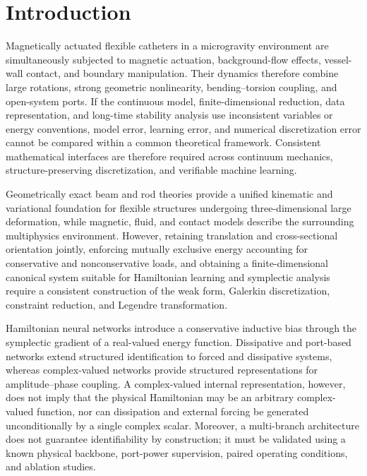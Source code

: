 \section*{Introduction}
\label{sec:introduction}

Magnetically actuated flexible catheters in a microgravity environment are simultaneously subjected to magnetic actuation, background-flow effects, vessel-wall contact, and boundary manipulation. Their dynamics therefore combine large rotations, strong geometric nonlinearity, bending--torsion coupling, and open-system ports. If the continuous model, finite-dimensional reduction, data representation, and long-time stability analysis use inconsistent variables or energy conventions, model error, learning error, and numerical discretization error cannot be compared within a common theoretical framework. Consistent mathematical interfaces are therefore required across continuum mechanics, structure-preserving discretization, and verifiable machine learning.

Geometrically exact beam and rod theories provide a unified kinematic and variational foundation for flexible structures undergoing three-dimensional large deformation, while magnetic, fluid, and contact models describe the surrounding multiphysics environment\cite{Simo1985FiniteStrainBeam,Antman2005Elasticity,Morison1950,COMSOLBeamInterface2025,COMSOLGeometricNonlinearity2025,COMSOLSectionStiffness2025,COMSOLWeakFormPDE2025,COMSOLWeakContribution2025,Sola2018MicroLie,Jackson1998Electrodynamics,Abbott2020MagneticRobotics,Newman1977MarineHydrodynamics,Faltinsen1990SeaLoads,Johnson1985ContactMechanics,HuntCrossley1975Restitution,BrownMcPhee2016Friction,MarsdenRatiu1999MechanicsSymmetry,HairerLubichWanner2006GNI}. However, retaining translation and cross-sectional orientation jointly, enforcing mutually exclusive energy accounting for conservative and nonconservative loads, and obtaining a finite-dimensional canonical system suitable for Hamiltonian learning and symplectic analysis require a consistent construction of the weak form, Galerkin discretization, constraint reduction, and Legendre transformation.

Hamiltonian neural networks introduce a conservative inductive bias through the symplectic gradient of a real-valued energy function. Dissipative and port-based networks extend structured identification to forced and dissipative systems, whereas complex-valued networks provide structured representations for amplitude--phase coupling\cite{Greydanus2019HNN,Zhong2020Dissipative,Desai2021PHNN,Chen2022KAMSLT,Trabelsi2018DeepComplex,Hirose2012CVNN}. A complex-valued internal representation, however, does not imply that the physical Hamiltonian may be an arbitrary complex-valued function, nor can dissipation and external forcing be generated unconditionally by a single complex scalar. Moreover, a multi-branch architecture does not guarantee identifiability by construction; it must be validated using a known physical backbone, port-power supervision, paired operating conditions, and ablation studies.

